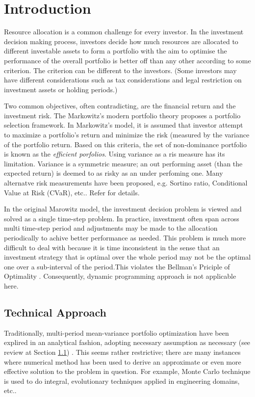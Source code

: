 \chapter{Introduction}
Resource allocation is a common challenge for every investor. In the investment decision making process, investors decide how much resources are allocated to different investable assets to form a portfolio with the aim to optimise the performance of the overall portfolio is better off than any other according to some criterion. The criterion can be different to the investors. (Some investors may have different considerations such as tax considerations and legal restriction on investment assets or holding periods.)

Two common objectives, often contradicting, are the financial return and the investment risk. The Markowitz's modern portfolio theory \cite{HM58} proposes a portfolio selection framework. In Markowitz's model, it is assumed that investor attempt to maximize a portfolio's return and minimize the risk (measured by the variance of the portfolio return. Based on this criteria, the set of non-dominance portfolio is known as the \emph{efficient porfolios}. Using variance as a ris measure has its limitation. Variance is a symmetric measure; an out performing asset (than the expected return) is deemed to as risky as an under perfoming one. Many alternatve risk measurements have been proposed, e.g. Sortino ratio, Conditional Value at Risk (CVaR), etc.. Refer \cite{X} for details.

In the original Marowitz model, the investment decision problem is viewed and solved as a single time-step problem. In practice, investment often span across multi time-step period and adjustments may be made to the allocation periodically to achive better performance as needed. This problem is much more difficult to deal with because it is time inconsistent in the sense that an investment strategy that is optimal over the whole period may not be the optimal one over a sub-interval of the period.This violates the Bellman's Priciple of Optimality \cite{X}. Consequently, dynamic programming approach is not applicable here. 

\section{Technical Approach}
Traditionally, multi-period mean-variance portfolio optimization have been explired in an analytical fashion, adopting necessary assumption as necessary (see review at Section \ref{}) . This seems rather restrictive; there are many instances where numerical method has been used to derive an approximate or even more effective solution to the problem in question. For example, Monte Carlo technique is used to do integral, evolutionary techniques applied in engineering domains, etc..

